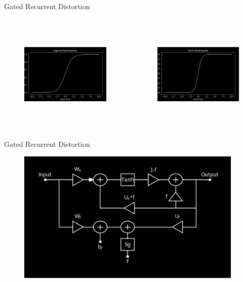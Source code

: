 \begin{frame}{Gated Recurrent Distortion}
    \begin{columns}
        \begin{column}{0.5\linewidth}
            \begin{figure}
                \includegraphics[height=2in]{../GatedRecurrentDistortion/Pics/sigmoid}
            \end{figure}
        \end{column}
        \begin{column}{0.5\linewidth}
            \begin{figure}
                \includegraphics[height=2in]{../GatedRecurrentDistortion/Pics/tanh}
            \end{figure}
        \end{column}
    \end{columns}
\end{frame}

\begin{frame}{Gated Recurrent Distortion}
    \begin{figure}
        \centering
        \includegraphics[height=2.5in]{../GatedRecurrentDistortion/Pics/gru_arch}
    \end{figure}
\end{frame}


